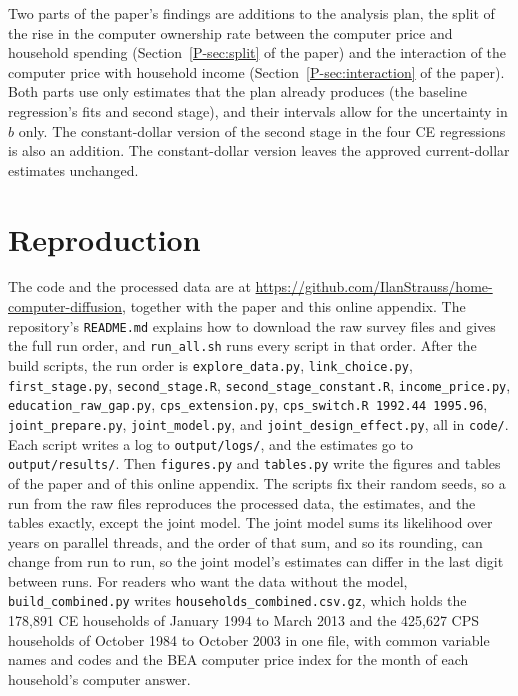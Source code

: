 \documentclass[11pt]{article}
\begin{document}
Two parts of the paper's findings are additions to the analysis plan, the split of the rise in the computer ownership rate between the computer price and household spending (Section~\ref{P-sec:split} of the paper) and the interaction of the computer price with household income (Section~\ref{P-sec:interaction} of the paper). Both parts use only estimates that the plan already produces (the baseline regression's fits and second stage), and their intervals allow for the uncertainty in $b$ only. The constant-dollar version of the second stage in the four CE regressions is also an addition. The constant-dollar version leaves the approved current-dollar estimates unchanged.

\section{Reproduction}
\label{app:repro}

\begingroup\raggedright
The code and the processed data are at \url{https://github.com/IlanStrauss/home-computer-diffusion}, together with the paper and this online appendix. The repository's \texttt{README.md} explains how to download the raw survey files and gives the full run order, and \texttt{run\_all.sh} runs every script in that order. After the build scripts, the run order is \texttt{explore\_data.py}, \texttt{link\_choice.py}, \texttt{first\_stage.py}, \texttt{second\_stage.R}, \texttt{second\_stage\_constant.R}, \texttt{income\_price.py}, \texttt{education\_raw\_gap.py}, \texttt{cps\_extension.py}, \texttt{cps\_switch.R 1992.44 1995.96}, \texttt{joint\_prepare.py}, \texttt{joint\_model.py}, and \texttt{joint\_design\_effect.py}, all in \texttt{code/}. Each script writes a log to \texttt{output/logs/}, and the estimates go to \texttt{output/results/}. Then \texttt{figures.py} and \texttt{tables.py} write the figures and tables of the paper and of this online appendix. The scripts fix their random seeds, so a run from the raw files reproduces the processed data, the estimates, and the tables exactly, except the joint model. The joint model sums its likelihood over years on parallel threads, and the order of that sum, and so its rounding, can change from run to run, so the joint model's estimates can differ in the last digit between runs. For readers who want the data without the model, \texttt{build\_combined.py} writes \texttt{households\_combined.csv.gz}, which holds the 178{,}891 CE households of January 1994 to March 2013 and the 425{,}627 CPS households of October 1984 to October 2003 in one file, with common variable names and codes and the BEA computer price index for the month of each household's computer answer.\par
\endgroup
\end{document}
